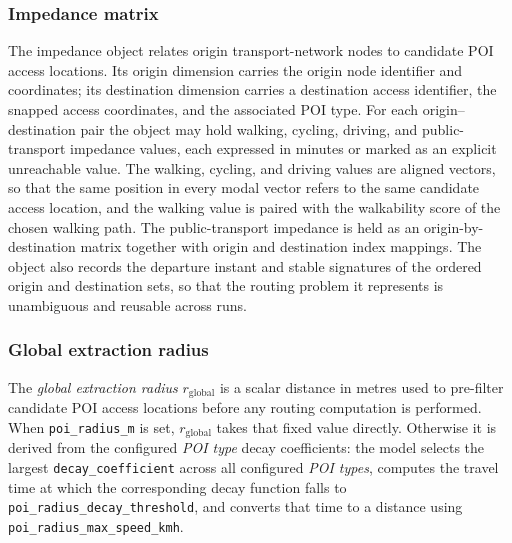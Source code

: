 \documentclass{article}
\begin{document}
\subsubsection*{Impedance matrix}
    The impedance object relates origin transport-network nodes to candidate POI
    access locations. Its origin dimension carries the origin node identifier and
    coordinates; its destination dimension carries a destination access identifier,
    the snapped access coordinates, and the associated POI type. For each
    origin--destination pair the object may hold walking, cycling, driving, and
    public-transport impedance values, each expressed in minutes or marked as an
    explicit unreachable value. The walking, cycling, and driving values are
    aligned vectors, so that the same position in every modal vector refers to the
    same candidate access location, and the walking value is paired with the
    walkability score of the chosen walking path. The public-transport impedance is
    held as an origin-by-destination matrix together with origin and destination
    index mappings. The object also records the departure instant and stable
    signatures of the ordered origin and destination sets, so that the routing
    problem it represents is unambiguous and reusable across runs.

\subsubsection*{Global extraction radius}
    The \emph{global extraction radius} $r_{\text{global}}$ is a scalar distance
    in metres used to pre-filter candidate POI access locations before any routing
    computation is performed. When \texttt{poi\_radius\_m} is set, $r_{\text{global}}$
    takes that fixed value directly. Otherwise it is derived from the configured
    \emph{POI type} decay coefficients: the model selects the largest
    \texttt{decay\_coefficient} across all configured \emph{POI types}, computes
    the travel time at which the corresponding decay function falls to
    \texttt{poi\_radius\_decay\_threshold}, and converts that time to a distance
    using \texttt{poi\_radius\_max\_speed\_kmh}.
\end{document}
